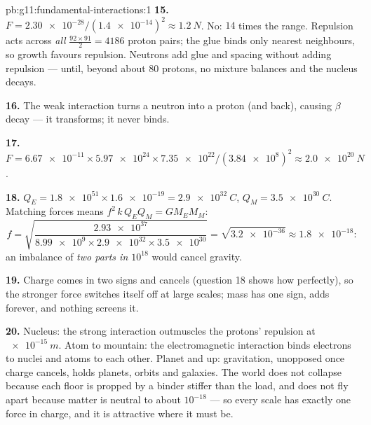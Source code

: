 \begin{solution}{pb:g11:fundamental-interactions:1}
\textbf{15.} $F = \num{2.30e-28}/(\num{1.4e-14})^2 \approx
\qty{1.2}{N}$. No: $14$ times the range. Repulsion acts across
\emph{all} $\frac{92\times91}{2} = 4186$ proton pairs; the glue binds
only nearest neighbours, so growth favours repulsion. Neutrons add glue
and spacing without adding repulsion --- until, beyond about $80$
protons, no mixture balances and the nucleus decays.

\textbf{16.} The weak interaction turns a neutron into a proton (and
back), causing $\beta$ decay --- it transforms; it never binds.

\textbf{17.} $F = \num{6.67e-11} \times \num{5.97e24} \times
\num{7.35e22}/(\num{3.84e8})^2 \approx \qty{2.0e20}{N}$.

\textbf{18.} $Q_E = \num{1.8e51} \times \num{1.6e-19} =
\qty{2.9e32}{C}$, $Q_M = \qty{3.5e30}{C}$. Matching forces means
$f^2\,k\,Q_E Q_M = G M_E M_M$:
\[
f = \sqrt{\frac{\num{2.93e37}}{\num{8.99e9} \times \num{2.9e32}
\times \num{3.5e30}}} = \sqrt{\num{3.2e-36}} \approx \num{1.8e-18} :
\]
an imbalance of \emph{two parts in $10^{18}$} would cancel gravity.

\textbf{19.} Charge comes in two signs and cancels (question 18 shows
how perfectly), so the stronger force switches itself off at large
scales; mass has one sign, adds forever, and nothing screens it.

\textbf{20.} Nucleus: the strong interaction outmuscles the protons'
repulsion at $\qty{e-15}{m}$. Atom to mountain: the electromagnetic
interaction binds electrons to nuclei and atoms to each other. Planet
and up: gravitation, unopposed once charge cancels, holds planets,
orbits and galaxies. The world does not collapse because each floor is
propped by a binder stiffer than the load, and does not fly apart
because matter is neutral to about $10^{-18}$ --- so every scale has
exactly one force in charge, and it is attractive where it must be.
\end{solution}
